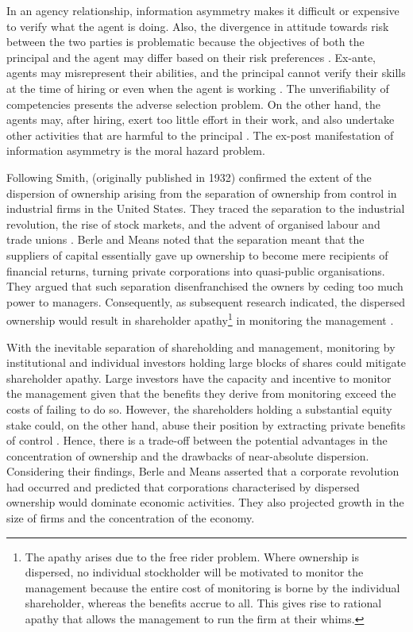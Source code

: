 \documentclass[a4paper,nobind]{templates/ociamthesis}
\begin{document}
In an agency relationship, information asymmetry makes it difficult or expensive to verify what the agent is doing. Also, the divergence in attitude towards risk between the two parties is problematic because the objectives of both the principal and the agent may differ based on their risk preferences \autocite{sun2016ownership}. Ex-ante, agents may misrepresent their abilities, and the principal cannot verify their skills at the time of hiring or even when the agent is working \autocite{eisenhardt1989agency}. The unverifiability of competencies presents the adverse selection problem. On the other hand, the agents may, after hiring, exert too little effort in their work, and also undertake other activities that are harmful to the principal \autocite{tirole2010theory}. The ex-post manifestation of information asymmetry is the moral hazard problem.

Following Smith, \textcite{berle1991modern} (originally published in 1932) confirmed the extent of the dispersion of ownership arising from the separation of ownership from control in industrial firms in the United States. They traced the separation to the industrial revolution, the rise of stock markets, and the advent of organised labour and trade unions \autocite{bendickson2016agency}. Berle and Means noted that the separation meant that the suppliers of capital essentially gave up ownership to become mere recipients of financial returns, turning private corporations into quasi-public organisations. They argued that such separation disenfranchised the owners by ceding too much power to managers. Consequently, as subsequent research indicated, the dispersed ownership would result in shareholder apathy\footnote{The apathy arises due to the free rider problem. Where ownership is dispersed, no individual stockholder will be motivated to monitor the management because the entire cost of monitoring is borne by the individual shareholder, whereas the benefits accrue to all. This gives rise to rational apathy that allows the management to run the firm at their whims.} in monitoring the management \autocite{battaglini2016dynamic}.

With the inevitable separation of shareholding and management, monitoring by institutional and individual investors holding large blocks of shares could mitigate shareholder apathy. Large investors have the capacity and incentive to monitor the management given that the benefits they derive from monitoring exceed the costs of failing to do so. However, the shareholders holding a substantial equity stake could, on the other hand, abuse their position by extracting private benefits of control \autocite{dyck2004private,doidge2004us}. Hence, there is a trade-off between the potential advantages in the concentration of ownership and the drawbacks of near-absolute dispersion. Considering their findings, Berle and Means asserted that a corporate revolution had occurred and predicted that corporations characterised by dispersed ownership would dominate economic activities. They also projected growth in the size of firms and the concentration of the economy.
\end{document}
